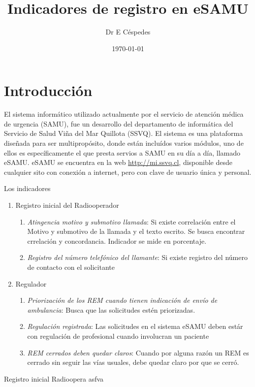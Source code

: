 \documentclass{article}
\title{Indicadores de registro en eSAMU}
\author[1]{Dr E Céspedes}
\affil[1]{Tecnologías SAMU Viña del Mar}
\date{\today}
\begin{document}
\maketitle


\tableofcontents

\section{Introducción}
El sistema informático utilizado actualmente por el servicio de atención médica de urgencia (SAMU), fue un desarrollo del departamento de informática del Servicio de Salud Viña del Mar Quillota (SSVQ). El sistema es una plataforma diseñada para ser multipropósito, donde están incluídos varios módulos, uno de ellos es específicamente el que presta servios a SAMU en su día a día, llamado eSAMU. eSAMU se encuentra en la web  \url{http://mi.ssvq.cl}, disponible desde cualquier sito con conexión a internet, pero con clave de usuario única y personal.



Los indicadores
\begin{enumerate}

\item Registro inicial del Radiooperador
	\begin{enumerate}
	\item \emph{Atingencia motivo y submotivo llamada}: Si existe correlación entre el Motivo y submotivo de la llamada y el texto escrito. Se busca encontrar crrelación y concordancia. Indicador se mide en porcentaje.
	
	\item \emph{Registro del número telefónico del llamante}: Si existe registro del número de contacto con el solicitante
	\end{enumerate}

\item Regulador
	\begin{enumerate}
	\item	\emph{Priorización de los REM cuando tienen indicación de envío de ambulancia}: Busca que las solicitudes estén priorizadas.

	\item 	\emph{Regulación registrada}: Las solicitudes en el sistema eSAMU deben estár con regulación de profesional cuando involucran un paciente

	\item 	\emph{REM cerrados deben quedar claros}: Cuando por alguna razón un REM es cerrado sin seguir las vías usuales, debe quedar claro por que se cerró.
	\end{enumerate}





\end{enumerate}
Registro inicial Radioopera
asfva
\end{document}

